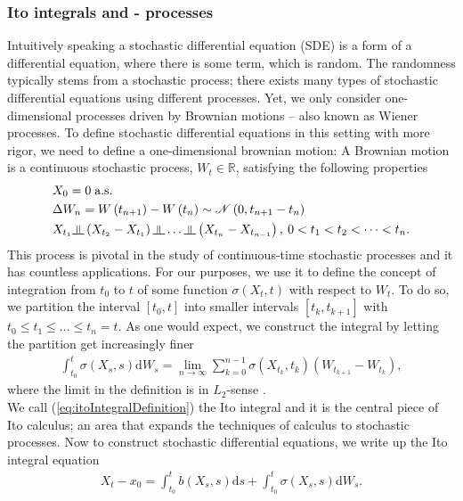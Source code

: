 \subsubsection{Ito integrals and - processes}
Intuitively speaking a stochastic differential equation (SDE) is a form of a differential equation, where there is some term, which is random. The randomness typically stems from a stochastic process; there exists many types of stochastic differential equations using different processes. Yet, we only consider one-dimensional processes driven by Brownian motions – also known as Wiener processes. To define stochastic differential equations in this setting with more rigor, we need to define a one-dimensional brownian motion: A Brownian motion is a continuous stochastic process, $W_t\in\mathbb{R}$, satisfying the following properties
\begin{align}
    &X_0 = 0 \; \textrm{a.s.}\label{eq:brownianMotion1}\\
    &\Delta W_n = W\left(t_{n + 1}\right) - W\left(t_{n}\right)\sim\mathcal{N}\left(0, t_{n + 1} - t_{n}\right) \label{eq:brownianMotion2}\\
    &X_{t_1}\indep \left(X_{t_2} - X_{t_1}\right)\indep \dots \indep \left(X_{t_n} - X_{t_{n - 1}}\right), \: 0 < t_1 < t_2 < \dots < t_n. \label{eq:brownianMotion3}
\end{align}
This process is pivotal in the study of continuous-time stochastic processes and it has countless applications. For our purposes, we use it to define the concept of integration from $t_0$ to $t$ of some function $\sigma(X_t, t)$ with respect to $W_t$. To do so, we partition the interval $[t_0, t]$ into smaller intervals $[t_k, t_{k + 1}]$ with $t_0 \leq t_1 \leq \dots \leq t_n = t$. As one would expect, we construct the integral by letting the partition get increasingly finer
\begin{align}
    \int_{t_0}^t \sigma(X_s, s) \mathrm{d}W_s = \lim_{n \to \infty}\sum_{k = 0}^{n - 1} \sigma\left(X_{t_k}, t_k\right)\left(W_{t_{k + 1}} - W_{t_k}\right),\label{eq:itoIntegralDefinition}
\end{align}
where the limit in the definition is in $L_2$-sense \cite[equation 4.6]{Srkk2019}. \\
We call (\ref{eq:itoIntegralDefinition}) the Ito integral and it is the central piece of Ito calculus; an area that expands the techniques of calculus to stochastic processes. Now to construct stochastic differential equations, we write up the Ito integral equation
\begin{align}
    X_t - x_0 = \int_{t_0}^t b(X_s, s)\mathrm{d}s + \int_{t_0}^t \sigma(X_s, s)\mathrm{d}W_s. \label{eq:itoIntegralEquation}
\end{align}
